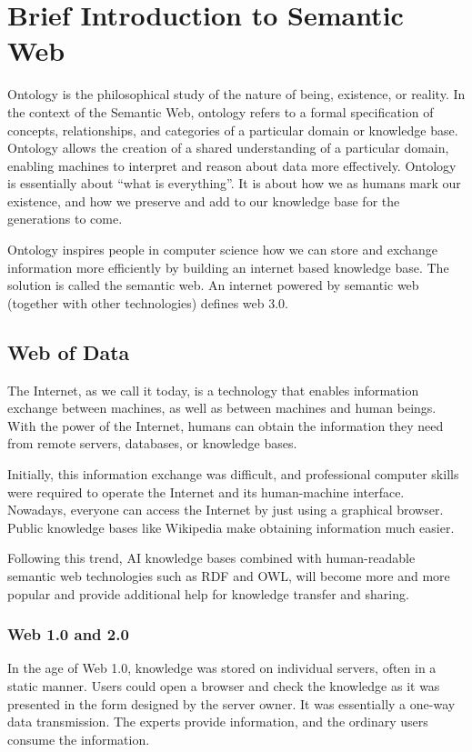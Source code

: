\chapter{Brief Introduction to Semantic Web} \label{ch:briefintrosemanticweb}

Ontology is the philosophical study of the nature of being, existence, or reality. In the context of the Semantic Web, ontology refers to a formal specification of concepts, relationships, and categories of a particular domain or knowledge base. Ontology allows the creation of a shared understanding of a particular domain, enabling machines to interpret and reason about data more effectively. Ontology is essentially about “what is everything”. It is about how we as humans mark our existence, and how we preserve and add to our knowledge base for the generations to come.

Ontology inspires people in computer science how we can store and exchange information more efficiently by building an internet based knowledge base. The solution is called the semantic web. An internet powered by semantic web (together with other technologies) defines web 3.0.

\section{Web of Data}

The Internet, as we call it today, is a technology that enables information exchange between machines, as well as between machines and human beings. With the power of the Internet, humans can obtain the information they need from remote servers, databases, or knowledge bases.

Initially, this information exchange was difficult, and professional computer skills were required to operate the Internet and its human-machine interface. Nowadays, everyone can access the Internet by just using a graphical browser. Public knowledge bases like Wikipedia make obtaining information much easier. 

Following this trend, AI knowledge bases combined with human-readable semantic web technologies such as RDF and OWL, will become more and more popular and provide additional help for knowledge transfer and sharing.

\subsection{Web 1.0 and 2.0}

In the age of Web 1.0, knowledge was stored on individual servers, often in a static manner. Users could open a browser and check the knowledge as it was presented in the form designed by the server owner. It was essentially a one-way data transmission. The experts provide information, and the ordinary users consume the information.

